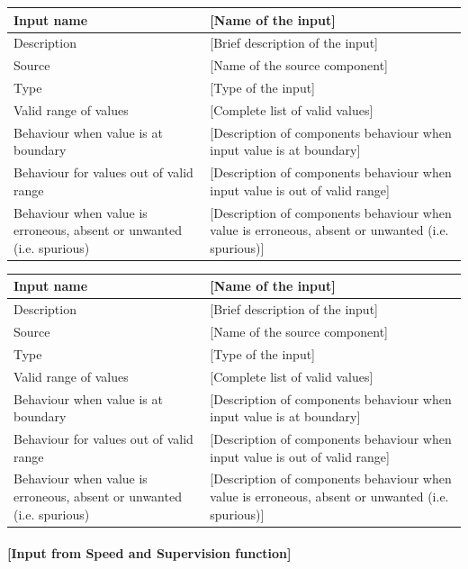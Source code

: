 \begin{longtable}{p{}p{}}
\toprule
Input name				& [Name of the input] \\
\midrule
Description				& [Brief description of the input] \\
\midrule
Source					& [Name of the source component] \\ 
\midrule
Type					& [Type of the input] \\
\midrule
Valid range of values	& [Complete list of valid values] \\
\midrule
Behaviour when value is at boundary	& [Description of components behaviour when input value is at boundary] \\
\midrule
Behaviour for values out of valid range	& [Description of components behaviour when input value is out of valid range] \\
\midrule
Behaviour when value is erroneous, absent or unwanted (i.e. spurious) & [Description of components behaviour when value is erroneous, absent or unwanted (i.e. spurious)] \\
\bottomrule
\end{longtable}


\begin{longtable}{p{}p{}}
\toprule
Input name				& [Name of the input] \\
\midrule
Description				& [Brief description of the input] \\
\midrule
Source					& [Name of the source component] \\ 
\midrule
Type					& [Type of the input] \\
\midrule
Valid range of values	& [Complete list of valid values] \\
\midrule
Behaviour when value is at boundary	& [Description of components behaviour when input value is at boundary] \\
\midrule
Behaviour for values out of valid range	& [Description of components behaviour when input value is out of valid range] \\
\midrule
Behaviour when value is erroneous, absent or unwanted (i.e. spurious) & [Description of components behaviour when value is erroneous, absent or unwanted (i.e. spurious)] \\
\bottomrule
\end{longtable}

\paragraph{[Input from Speed and Supervision function]}

